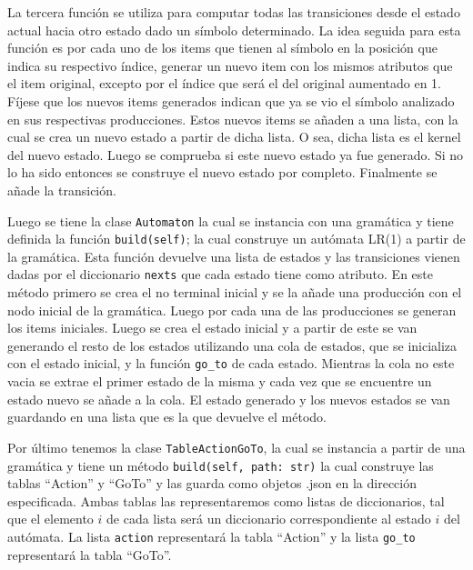 La tercera funci\'on se utiliza para computar todas las transiciones desde el estado actual hacia otro estado dado un s\'imbolo determinado. La idea seguida para esta funci\'on es por cada uno de los items que tienen al s\'imbolo en la posici\'on que indica su respectivo \'indice, generar un nuevo item con los mismos atributos que el item original, excepto por el \'indice que ser\'a el del original aumentado en 1. F\'ijese que los nuevos items generados indican que ya se vio el s\'imbolo analizado en sus respectivas producciones. Estos nuevos items se a\~{n}aden a una lista, con la cual se crea un nuevo estado a partir de dicha lista. O sea, dicha lista es el kernel del nuevo estado. Luego se comprueba si este nuevo estado ya fue generado. Si no lo ha sido entonces se construye el nuevo estado por completo. Finalmente se a\~{n}ade la transici\'on.

Luego se tiene la clase \verb|Automaton| la cual se instancia con una gram\'atica y tiene definida la funci\'on \verb|build(self)|; la cual construye un aut\'omata LR(1) a partir de la gram\'atica. Esta funci\'on devuelve una lista de estados y las transiciones vienen dadas por el diccionario \verb|nexts| que cada estado tiene como atributo. En este m\'etodo primero se crea el no terminal inicial y se la a\~{n}ade una producci\'on con el nodo inicial de la gram\'atica. Luego por cada una de las producciones se generan los items iniciales. Luego se crea el estado inicial y a partir de este se van generando el resto de los estados utilizando una cola de estados, que se inicializa con el estado inicial, y la funci\'on \verb|go_to| de cada estado.  Mientras la cola no este vacia se extrae el primer estado de la misma y cada vez que se encuentre un estado nuevo se a\~{nade} a la cola. El estado generado y los nuevos estados se van guardando en una lista que es la que devuelve el m\'etodo.

Por \'ultimo tenemos la clase \verb|TableActionGoTo|, la cual se instancia a partir de una gram\'atica y tiene un m\'etodo \verb|build(self, path: str)| la cual construye las tablas ``Action'' y ``GoTo'' y las guarda como objetos .json en la direcci\'on especificada. Ambas tablas las representaremos como listas de diccionarios, tal que el elemento $i$ de cada lista ser\'a un diccionario correspondiente al estado $i$ del aut\'omata. La lista \verb|action| representar\'a la tabla ``Action'' y la lista \verb|go_to| representar\'a la tabla ``GoTo''.

